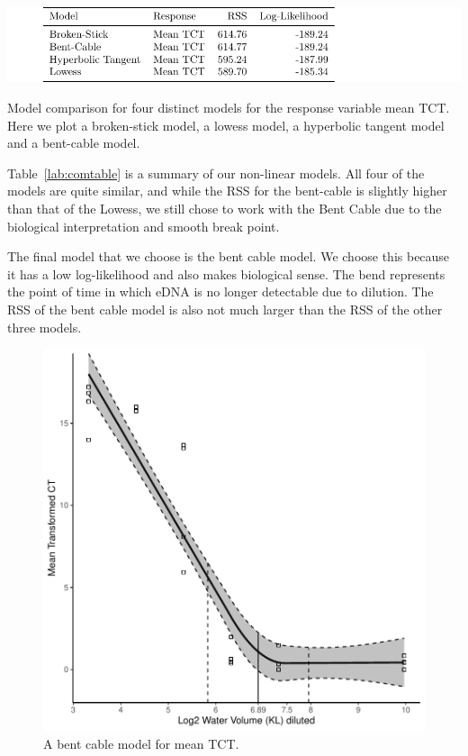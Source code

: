 \begin{table}[H]
\includegraphics{Chapter4Images/nichealternate.pdf}
\caption{Model comparison for four distinct models for the response variable mean TCT. Here we plot a broken-stick model, a lowess model, a hyperbolic tangent model and a bent-cable model.}
\label{lab:comtable}
\end{table}


Table~\ref{lab:comtable} is a summary of our non-linear models. All four of the models are quite similar, and while the RSS for the bent-cable is slightly higher than that of the Lowess, we still chose to work with the Bent Cable due to the biological interpretation and smooth break point.


\newpage

The final model that we choose is the bent cable model. We choose this because it has a low log-likelihood and also makes biological sense. The bend represents the point of time in which eDNA is no longer detectable due to dilution. The RSS of the bent cable model is also not much larger than the RSS of the other three models.



\begin{figure}[H]
\includegraphics{Chapter4Images/flowggplot1.pdf}
\caption{ A bent cable model for mean TCT.}
\label{fig:bentcablemean}
\end{figure}


